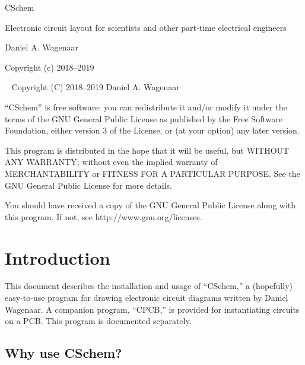 \documentclass[11pt]{report}
\begin{document}
\thispagestyle{empty}
\begin{centering}
  {\Huge CSchem}
  \vskip30pt

  {\large Electronic circuit layout for scientists and other part-time electrical engineers}
  \vskip60pt

  {\large Daniel A. Wagenaar}
  \vfill
  
  {Copyright (c) 2018--2019}
  
\end{centering}
\pagebreak
~
\vfill
\noindent Copyright (C) 2018--2019 Daniel A. Wagenaar\medskip

``CSchem'' is free software: you can redistribute it and/or modify
it under the terms of the GNU General Public License as published by
the Free Software Foundation, either version 3 of the License, or
(at your option) any later version.

This program is distributed in the hope that it will be useful,
but WITHOUT ANY WARRANTY; without even the implied warranty of
MERCHANTABILITY or FITNESS FOR A PARTICULAR PURPOSE.  See the
GNU General Public License for more details.

You should have received a copy of the GNU General Public License
along with this program.  If not, see http://www.gnu.org/licenses.
\pagebreak

\chapter{Introduction}

This document describes the installation and usage of ``CSchem,'' a
(hopefully) easy-to-use program for drawing electronic circuit
diagrams written by Daniel Wagenaar. A companion program, ``CPCB,''
is provided for instantiating circuits on a PCB. This program is
documented separately.

\section{Why use CSchem?}
\end{document}
